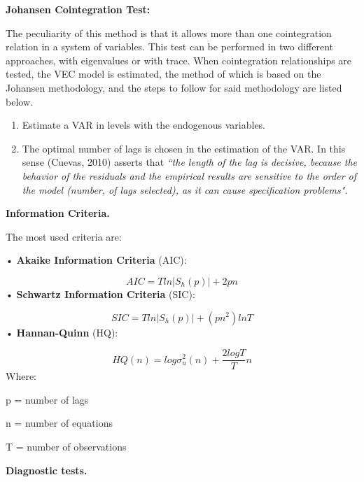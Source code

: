 \documentclass[12pt,english, spanish]{smfart}
\begin{document}
\textbf{Johansen Cointegration Test:}\par
The peculiarity of this method is that it allows more than one cointegration relation in a system of variables. This test can be performed in two different approaches, with eigenvalues or with trace. When cointegration relationships are tested, the VEC model is estimated, the method of which is based on the Johansen methodology, and the steps to follow for said methodology are listed below.\par
\begin{enumerate}
\item Estimate a VAR in levels with the endogenous variables.
\item The optimal number of lags is chosen in the estimation of the VAR. In this sense (Cuevas, 2010) asserts that \textit{“the length of the lag is decisive, because the behavior of the residuals and the empirical results are sensitive to the order of the model (number, of lags selected), as it can cause specification problems".} 
\end{enumerate}
\textbf{Information Criteria.}\par
The most used criteria are:\par
• \textbf{Akaike Information Criteria} (AIC):\par
 \begin{equation}
 AIC = Tln|S_{h}(p)|+2pn
 \end{equation}
• \textbf{Schwartz Information Criteria} (SIC):\par
  \begin{equation}
 SIC = Tln|S_{h}(p)|+(pn^2)lnT
 \end{equation}
• \textbf{Hannan-Quinn} (HQ):\par
   \begin{equation}
 HQ(n) = log\sigma^2_{u}(n)+\frac{2logT}{T}n
 \end{equation}
Where:\par
p = number of lags\par
n = number of equations\par
T = number of observations\par
\textbf{Diagnostic tests.}\par
\end{document}
